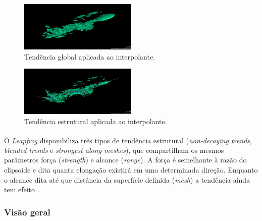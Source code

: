 \begin{figure}[!htb]
	\caption{\label{global}Tendência global aplicada ao interpolante.}
	\begin{center}
		\includegraphics[width=0.5\textwidth]{revisao_bibliografica/global_trend_interpolant}
	\end{center}
\end{figure}

\begin{figure}[!htb]
	\caption{\label{estrutural}Tendência estrutural aplicada ao interpolante.}
	\begin{center}
		\includegraphics[width=0.5\textwidth]{revisao_bibliografica/structural_trend_interpolant}
	\end{center}
\end{figure}

O \textit{Leapfrog}\textsuperscript{\textregistered} disponibiliza três tipos de tendência estrutural (\textit{non-decaying trends}, \textit{blended trends} e \textit{strongest along meshes}), que compartilham os mesmos parâmetros força (\textit{strength}) e alcance (\textit{range}). A força é semelhante à razão do elipsoide e dita quanta elongação existirá em uma determinada direção. Enquanto o alcance dita até que distância da superfície definida (\textit{mesh}) a tendência ainda tem efeito \cite{leapfrogstructural}.  

\subsubsection{Visão geral}

